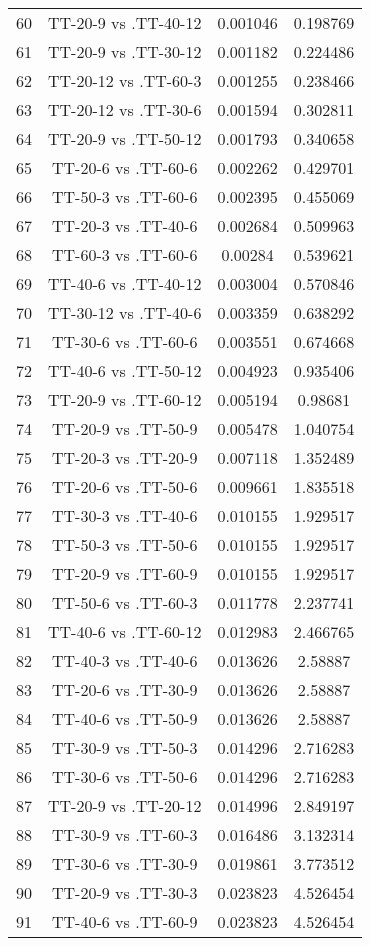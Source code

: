 \documentclass[a4paper,10pt]{article}
\begin{document}
\begin{landscape}
\begin{table}[!htp]
\begin{tabular}{cccc}
60&TT-20-9 vs .TT-40-12&0.001046&0.198769\\
61&TT-20-9 vs .TT-30-12&0.001182&0.224486\\
62&TT-20-12 vs .TT-60-3&0.001255&0.238466\\
63&TT-20-12 vs .TT-30-6&0.001594&0.302811\\
64&TT-20-9 vs .TT-50-12&0.001793&0.340658\\
65&TT-20-6 vs .TT-60-6&0.002262&0.429701\\
66&TT-50-3 vs .TT-60-6&0.002395&0.455069\\
67&TT-20-3 vs .TT-40-6&0.002684&0.509963\\
68&TT-60-3 vs .TT-60-6&0.00284&0.539621\\
69&TT-40-6 vs .TT-40-12&0.003004&0.570846\\
70&TT-30-12 vs .TT-40-6&0.003359&0.638292\\
71&TT-30-6 vs .TT-60-6&0.003551&0.674668\\
72&TT-40-6 vs .TT-50-12&0.004923&0.935406\\
73&TT-20-9 vs .TT-60-12&0.005194&0.98681\\
74&TT-20-9 vs .TT-50-9&0.005478&1.040754\\
75&TT-20-3 vs .TT-20-9&0.007118&1.352489\\
76&TT-20-6 vs .TT-50-6&0.009661&1.835518\\
77&TT-30-3 vs .TT-40-6&0.010155&1.929517\\
78&TT-50-3 vs .TT-50-6&0.010155&1.929517\\
79&TT-20-9 vs .TT-60-9&0.010155&1.929517\\
80&TT-50-6 vs .TT-60-3&0.011778&2.237741\\
81&TT-40-6 vs .TT-60-12&0.012983&2.466765\\
82&TT-40-3 vs .TT-40-6&0.013626&2.58887\\
83&TT-20-6 vs .TT-30-9&0.013626&2.58887\\
84&TT-40-6 vs .TT-50-9&0.013626&2.58887\\
85&TT-30-9 vs .TT-50-3&0.014296&2.716283\\
86&TT-30-6 vs .TT-50-6&0.014296&2.716283\\
87&TT-20-9 vs .TT-20-12&0.014996&2.849197\\
88&TT-30-9 vs .TT-60-3&0.016486&3.132314\\
89&TT-30-6 vs .TT-30-9&0.019861&3.773512\\
90&TT-20-9 vs .TT-30-3&0.023823&4.526454\\
91&TT-40-6 vs .TT-60-9&0.023823&4.526454\\

\end{tabular}
\end{table}
\end{landscape}
\end{document}
